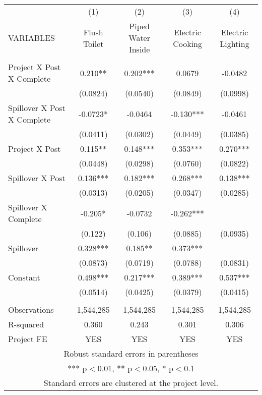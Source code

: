 \begin{tabular}{lcccc} \hline
 & (1) & (2) & (3) & (4)  \\
VARIABLES & Flush Toilet & Piped Water Inside & Electric Cooking & Electric Lighting \\ \hline
 &  &  &  &   \\
Project X Post X Complete & 0.210** & 0.202*** & 0.0679 & -0.0482 \\
 & (0.0824) & (0.0540) & (0.0849) & (0.0998)  \\
 Spillover X Post X Complete & -0.0723* & -0.0464 & -0.130*** & -0.0461 \\
 & (0.0411) & (0.0302) & (0.0449) & (0.0385)  \\
Project X Post & 0.115** & 0.148*** & 0.353*** & 0.270***  \\
 & (0.0448) & (0.0298) & (0.0760) & (0.0822)  \\
Spillover X Post & 0.136*** & 0.182*** & 0.268*** & 0.138***  \\
 & (0.0313) & (0.0205) & (0.0347) & (0.0285)  \\
Spillover X Complete & -0.205* & -0.0732 & -0.262*** \\
 & (0.122) & (0.106) & (0.0885) & (0.0935)  \\
Spillover & 0.328*** & 0.185** & 0.373***  \\
 & (0.0873) & (0.0719) & (0.0788) & (0.0831) \\
Constant & 0.498*** & 0.217*** & 0.389*** & 0.537***  \\
 & (0.0514) & (0.0425) & (0.0379) & (0.0415)  \\
 &  &  &  &   \\
Observations & 1,544,285 & 1,544,285 & 1,544,285 & 1,544,285  \\
R-squared & 0.360 & 0.243 & 0.301 & 0.306  \\
 Project FE & YES & YES & YES & YES  \\ \hline
\multicolumn{5}{c}{ Robust standard errors in parentheses} \\
\multicolumn{5}{c}{ *** p$<$0.01, ** p$<$0.05, * p$<$0.1} \\
\multicolumn{5}{c}{ Standard errors are clustered at the project level.} \\
\end{tabular}

